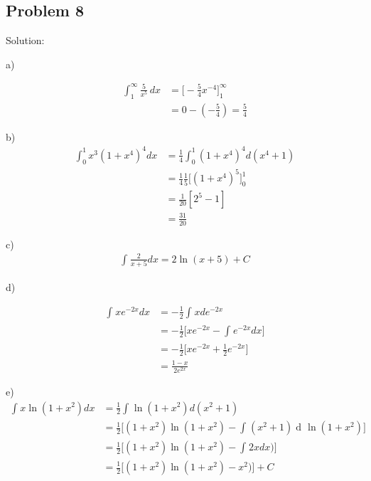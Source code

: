 \documentclass[letterpaper, 11pt]{article}
\newcommand{\1}{\mathds{1}}	%
\DeclareMathOperator*{\dv}{d\!}           %
\theoremstyle{definition}
\begin{document}
  \subsection*{Problem 8}

  Solution:

  a)

  \begin{align*}
    \int_{1}^{\infty } \frac{5}{x ^{5}} \, dx & = \Big[- \frac{5}{4}x ^{-4}\Big]_{1}^{\infty} \\
                                              & = 0-(-\frac{5}{4}) = \frac{5}{4}
  \end{align*}

  b)
  \begin{align*}
    \int_{0}^{1} x ^{3}(1 +x ^{4})^{4} dx & = \frac{1}{4}\int_{0}^{1}(1+x ^{4})^{4} d(x ^{4}+1)          \\
                                          & = \frac{1}{4} \frac{1}{5} \Big[(1+x ^{4} )^{5} \Big]_{0}^{1} \\
                                          & = \frac{1}{20}[2 ^{5} - 1]                                   \\
                                          & = \frac{31}{20}
  \end{align*}

  c)
  \begin{align*}
    \int_{}^{}\frac{2}{x + 5} dx = 2\ln (x+5) + C
  \end{align*}

  d)

  \begin{align*}
    \int_{}^{}xe ^{-2x}dx & = -\frac{1}{2}\int_{}^{}x de ^{-2x}                      \\
                          & = -\frac{1}{2}\Big[xe ^{-2x} - \int_{}^{}e ^{-2x}dx\Big] \\
                          & =-\frac{1}{2}\Big[xe ^{-2x} + \frac{1}{2}e ^{-2x}\Big]   \\
                          & = \frac{1-x}{2e ^{2x}}
  \end{align*}

  e)
  \begin{align*}
    \int_{}^{}x \ln(1+x ^{2}) dx & =\frac{1}{2} \int_{}^{}\ln(1+x ^{2}) d(x ^{2}+1)                                         \\
                                 & = \frac{1}{2}\Big[(1+x ^{2})\ln(1+x ^{2}) - \int_{}^{}(x ^{2} + 1)\dv \ln(1+x ^{2})\Big] \\
                                 & =\frac{1}{2}\Big[(1+x ^{2})\ln(1+x ^{2}) - \int_{}^{} 2x
    dx)\Big]                                                                                                                \\
                                 & =\frac{1}{2}\Big[(1+x ^{2})\ln(1+x ^{2}) - x ^{2})\Big] + C                              \\
  \end{align*}
\end{document}
